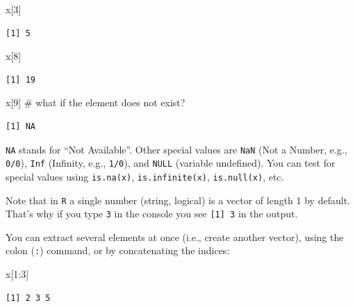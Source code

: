 \documentclass[
  letterpaper,
  DIV=11,
  numbers=noendperiod]{scrreprt}
\newenvironment{Shaded}{\begin{snugshade}}{\end{snugshade}}
\newcommand{\CommentTok}[1]{\textcolor[rgb]{0.37,0.37,0.37}{#1}}
\newcommand{\DecValTok}[1]{\textcolor[rgb]{0.68,0.00,0.00}{#1}}
\newcommand{\NormalTok}[1]{\textcolor[rgb]{0.00,0.23,0.31}{#1}}
\newcommand{\SpecialCharTok}[1]{\textcolor[rgb]{0.37,0.37,0.37}{#1}}
\begin{document}
\begin{Shaded}
\begin{Highlighting}[]
\NormalTok{x[}\DecValTok{3}\NormalTok{]}
\end{Highlighting}
\end{Shaded}

\begin{verbatim}
[1] 5
\end{verbatim}

\begin{Shaded}
\begin{Highlighting}[]
\NormalTok{x[}\DecValTok{8}\NormalTok{]}
\end{Highlighting}
\end{Shaded}

\begin{verbatim}
[1] 19
\end{verbatim}

\begin{Shaded}
\begin{Highlighting}[]
\NormalTok{x[}\DecValTok{9}\NormalTok{] }\CommentTok{\# what if the element does not exist?}
\end{Highlighting}
\end{Shaded}

\begin{verbatim}
[1] NA
\end{verbatim}

\texttt{NA} stands for ``Not Available''. Other special values are
\texttt{NaN} (Not a Number, e.g., \texttt{0/0}), \texttt{Inf} (Infinity,
e.g., \texttt{1/0}), and \texttt{NULL} (variable undefined). You can
test for special values using \texttt{is.na(x)},
\texttt{is.infinite(x)}, \texttt{is.null(x)}, etc.

Note that in \texttt{R} a single number (string, logical) is a vector of
length 1 by default. That's why if you type \texttt{3} in the console
you see \texttt{{[}1{]}\ 3} in the output.

You can extract several elements at once (i.e., create another vector),
using the colon (\texttt{:}) command, or by concatenating the indices:

\begin{Shaded}
\begin{Highlighting}[]
\NormalTok{x[}\DecValTok{1}\SpecialCharTok{:}\DecValTok{3}\NormalTok{]}
\end{Highlighting}
\end{Shaded}

\begin{verbatim}
[1] 2 3 5
\end{verbatim}
\end{document}
